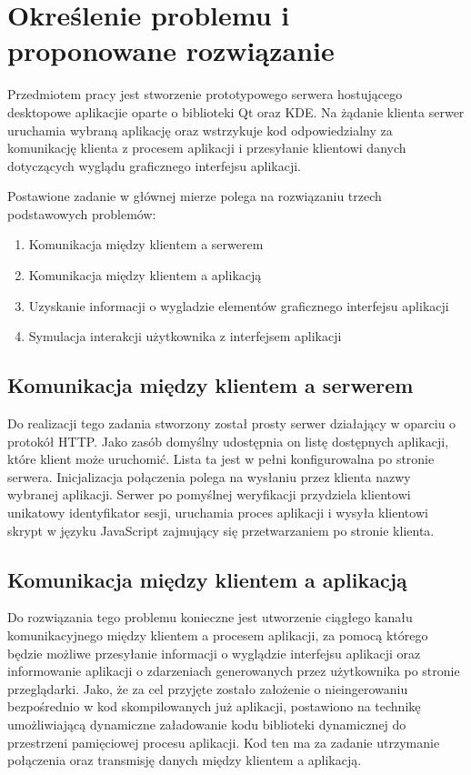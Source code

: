 \documentclass[polish]{inz}
\begin{document}
\chapter{Określenie problemu i proponowane rozwiązanie}

Przedmiotem pracy jest stworzenie prototypowego serwera hostującego desktopowe aplikacjie oparte o biblioteki Qt oraz KDE. Na żądanie klienta serwer uruchamia wybraną aplikację oraz wstrzykuje kod odpowiedzialny za komunikację klienta z procesem aplikacji i przesyłanie klientowi danych dotyczących wyglądu graficznego interfejsu aplikacji. 

Postawione zadanie w głównej mierze polega na rozwiązaniu trzech podstawowych problemów:
\begin{enumerate}
  \item Komunikacja między klientem a serwerem
  \item Komunikacja między klientem a aplikacją
  \item Uzyskanie informacji o wygladzie elementów graficznego interfejsu aplikacji
  \item Symulacja interakcji użytkownika z interfejsem aplikacji
\end{enumerate}

\section{Komunikacja między klientem a serwerem}

Do realizacji tego zadania stworzony został prosty serwer działający w oparciu o protokół HTTP. Jako zasób domyślny udostępnia on listę dostępnych aplikacji, które klient może uruchomić. Lista ta jest w pełni konfigurowalna po stronie serwera. Inicjalizacja połączenia polega na wysłaniu przez klienta nazwy wybranej aplikacji. Serwer po pomyślnej weryfikacji przydziela klientowi unikatowy identyfikator sesji, uruchamia proces aplikacji i wysyła klientowi skrypt w języku JavaScript zajmujący się przetwarzaniem po stronie klienta.

\section{Komunikacja między klientem a aplikacją}
Do rozwiązania tego problemu konieczne jest utworzenie ciągłego kanału komunikacyjnego między klientem a procesem aplikacji, za pomocą którego będzie możliwe przesyłanie informacji o wyglądzie interfejsu aplikacji oraz informowanie aplikacji o zdarzeniach generowanych przez użytkownika po stronie przeglądarki. Jako, że za cel przyjęte zostało założenie o nieingerowaniu bezpośrednio w kod skompilowanych już aplikacji, postawiono na technikę umożliwiającą dynamiczne załadowanie kodu biblioteki dynamicznej do przestrzeni pamięciowej procesu aplikacji. Kod ten ma za zadanie utrzymanie połączenia oraz transmisję danych między klientem a aplikacją.
\end{document}
